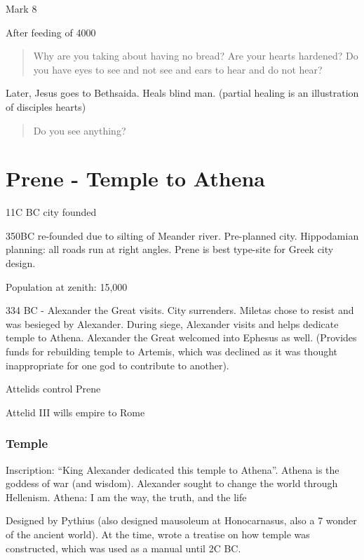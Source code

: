 \documentclass[
]{book}
\begin{document}
Mark 8

After feeding of 4000

\begin{quote}
Why are you taking about having no bread? Are your hearts hardened? Do you have eyes to see and not see and ears to hear and do not hear?
\end{quote}

Later, Jesus goes to Bethsaida. Heals blind man. (partial healing is an illustration of disciples hearts)

\begin{quote}
Do you see anything?
\end{quote}

\hypertarget{prene---temple-to-athena}{%
\chapter{Prene - Temple to Athena}\label{prene---temple-to-athena}}

11C BC city founded

350BC re-founded due to silting of Meander river. Pre-planned city. Hippodamian planning: all roads run at right angles. Prene is best type-site for Greek city design.

Population at zenith: 15,000

334 BC - Alexander the Great visits. City surrenders. Miletas chose to resist and was besieged by Alexander. During siege, Alexander visits and helps dedicate temple to Athena. Alexander the Great welcomed into Ephesus as well. (Provides funds for rebuilding temple to Artemis, which was declined as it was thought inappropriate for one god to contribute to another).

Attelids control Prene

Attelid III wills empire to Rome

\hypertarget{temple}{%
\subsection{Temple}\label{temple}}

Inscription: ``King Alexander dedicated this temple to Athena''. Athena is the goddess of war (and wisdom). Alexander sought to change the world through Hellenism. Athena: I am the way, the truth, and the life

Designed by Pythius (also designed mausoleum at Honocarnasus, also a 7 wonder of the ancient world). At the time, wrote a treatise on how temple was constructed, which was used as a manual until 2C BC.
\end{document}
